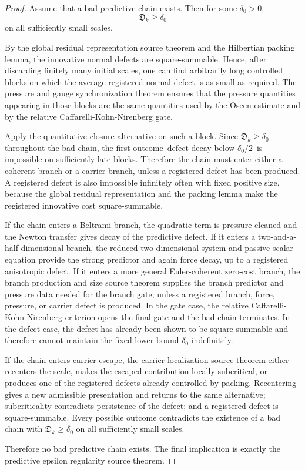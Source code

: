 \documentclass[11pt]{article}
\begin{document}
\begin{proof}
Assume that a bad predictive chain exists. Then for some \(\delta_0>0\),
\[
\mathfrak D_k\ge\delta_0
\]
on all sufficiently small scales.

By the global residual representation source theorem and the Hilbertian packing
lemma, the innovative normal defects are square-summable. Hence, after discarding
finitely many initial scales, one can find arbitrarily long controlled blocks on
which the average registered normal defect is as small as required.  The pressure
and gauge synchronization theorem ensures that the pressure quantities appearing
in those blocks are the same quantities used by the Oseen estimate and by the
relative Caffarelli-Kohn-Nirenberg gate.

Apply the quantitative closure alternative on such a block. Since
\(\mathfrak D_k\ge\delta_0\) throughout the bad chain, the first outcome--defect
decay below \(\delta_0/2\)--is impossible on sufficiently late blocks. Therefore
the chain must enter either a coherent branch or a carrier branch, unless a
registered defect has been produced. A registered defect is also impossible
infinitely often with fixed positive size, because the global residual
representation and the packing lemma make the registered innovative cost
square-summable.

If the chain enters a Beltrami branch, the quadratic term is pressure-cleaned and
the Newton transfer gives decay of the predictive defect. If it enters a
two-and-a-half-dimensional branch, the reduced two-dimensional system and passive
scalar equation provide the strong predictor and again force decay, up to a
registered anisotropic defect. If it enters a more general Euler-coherent
zero-cost branch, the branch production and size source theorem supplies the
branch predictor and pressure data needed for the branch gate, unless a
registered branch, force, pressure, or carrier defect is produced. In the gate
case, the relative Caffarelli-Kohn-Nirenberg criterion opens the final gate and
the bad chain terminates. In the defect case, the defect has already been shown
to be square-summable and therefore cannot maintain the fixed lower bound
\(\delta_0\) indefinitely.

If the chain enters carrier escape, the carrier localization source theorem
either recenters the scale, makes the escaped contribution locally subcritical,
or produces one of the registered defects already controlled by packing.
Recentering gives a new admissible presentation and returns to the same
alternative; subcriticality contradicts persistence of the defect; and a
registered defect is square-summable. Every possible outcome contradicts the
existence of a bad chain with \(\mathfrak D_k\ge\delta_0\) on all sufficiently
small scales.

Therefore no bad predictive chain exists. The final implication is exactly the
predictive epsilon regularity source theorem.
\end{proof}
\end{document}
